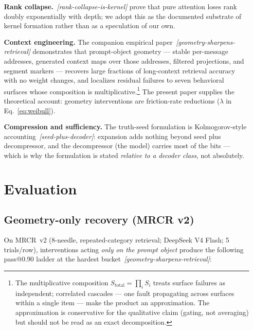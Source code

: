 \documentclass[11pt]{article}
\theoremstyle{remark}
\newif\ifslugs \slugstrue  %
\newcommand{\slug}[1]{\ifslugs\,{\small\textit{[#1]}}\fi}
\begin{document}
\textbf{Rank collapse.} \citet{dong2021attention}\slug{rank-collapse-is-kernel} prove that pure attention loses rank
doubly exponentially with depth; we adopt this as the documented substrate of kernel
formation rather than as a speculation of our own.

\textbf{Context engineering.} The companion empirical paper \citep{franz2026lens}\slug{geometry-sharpens-retrieval}
demonstrates that prompt-object geometry --- stable per-message addresses, generated
context maps over those addresses, filtered projections, and segment markers ---
recovers large fractions of long-context retrieval accuracy with no weight changes,
and localizes residual failures to seven behavioral surfaces whose composition is
multiplicative.\footnote{The multiplicative composition
$S_{\mathrm{total}} = \prod_i S_i$ treats surface failures as independent;
correlated cascades --- one fault propagating across surfaces within a single
item --- make the product an approximation. The approximation is conservative
for the qualitative claim (gating, not averaging) but should not be read as an
exact decomposition.} The present paper supplies the theoretical account: geometry
interventions are friction-rate reductions ($\lambda$ in Eq.~\eqref{eq:weibull}).

\textbf{Compression and sufficiency.} The truth-seed formulation is Kolmogorov-style
accounting \citep{kolmogorov1965}\slug{seed-plus-decoder}: expansion adds nothing beyond seed plus
decompressor, and the decompressor (the model) carries most of the bits --- which is
why the formulation is stated \emph{relative to a decoder class}, not absolutely.

\section{Evaluation}
\label{sec:eval}

\subsection{Geometry-only recovery (MRCR v2)}

On MRCR~v2 (8-needle, repeated-category retrieval; DeepSeek V4 Flash; 5 trials/row),
interventions acting \emph{only on the prompt object} produce the following pass@0.90
ladder at the hardest bucket \citep{franz2026lens}\slug{geometry-sharpens-retrieval}:
\end{document}
